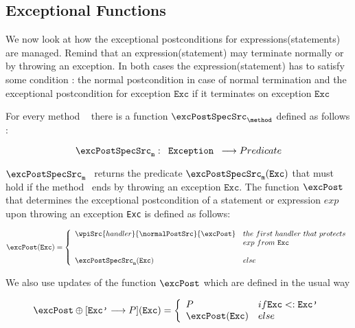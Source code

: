 
\subsection{Exceptional Functions}
We now look at how the exceptional postconditions for expressions(statements) are managed. 
Remind that an expression(statement) may terminate normally or by throwing an exception. 
In both cases the expression(statement) has to satisfy some condition : 
the normal postcondition in case of normal termination and the exceptional postcondition
for exception $\texttt{Exc}$ if it terminates on exception $\texttt{Exc}$


For every method \method~ there is a function $ \excPostSpecSrc_{\method}$ defined as follows :

$$ \excPostSpecSrc_{\tt{m}} : \texttt{ Exception  } \longrightarrow Predicate $$ 

$\excPostSpecSrc_{\tt{m}}$ \ returns the predicate $\excPostSpecSrc_{\tt{m}} (\texttt{Exc}) $ that must hold if the method \method \ 
ends by throwing an exception $\texttt{Exc}$. 
The function $\excPost$ that determines the exceptional postcondition of a statement or expression $exp$
 upon throwing an exception \texttt{Exc} is defined as follows:

$$
\excPost(\texttt{Exc}) = 
       \left\{\begin{array}{ll} 
         \wpiSrc{handler}{\normalPostSrc}{\excPost} &  the \ first \ handler \ that  \ protects \\
                                                    &  exp \ from \ \texttt{Exc} \\
                                                    & \\
         \excPostSpecSrc_{\tt{m}}(\texttt{Exc} )    & else 
     \end{array}\right.$$

We also use updates of the function $\excPost$ which are defined in the usual way


$$
\excPost \oplus[\texttt{Exc'} \longrightarrow P](\texttt{Exc})  = 
       \left\{\begin{array}{ll} 
         P & if \texttt{Exc} <: \texttt{Exc'} \\
         \excPost(\texttt{Exc} ) & else 
     \end{array}\right.$$
